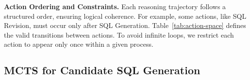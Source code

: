 \begin{table}[t!]
    \centering
    \vspace{-1em}
    \caption{Action Space with Ordering.}
    \label{tab:action-space}
\vspace{-1.5em}
\end{table}


\textbf{Action Ordering and Constraints.}
Each reasoning trajectory follows a structured order, ensuring logical coherence. For example, some actions, like SQL Revision, must occur only after SQL Generation.
Table~\ref{tab:action-space} defines the valid transitions between actions. To avoid infinite loops, we restrict each action to appear only once within a given process.


\subsection{MCTS for Candidate SQL Generation}
\label{sub:mcts}



